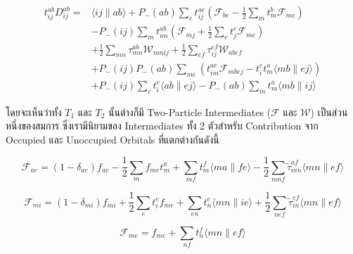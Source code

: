\noindent {}

\begin{equation}
  \label{eq:doubles_cluster_operator}
  \begin{aligned}
    t_{i j}^{a b} D_{i j}^{a b}
    =
     & \langle i j \| a b\rangle+P_{-}(a b) \sum_e t_{i j}^{a e}\left(\mathscr{F}_{b e}
    - \frac{1}{2} \sum_m t_m^b \mathscr{F}_{m e}\right)                                                             \\
     & - P_{-}(i j) \sum_m t_{i m}^{a b}\left(\mathscr{F}_{m j} + \frac{1}{2} \sum_e t_j^e \mathscr{F}_{m e}\right) \\
     & + \frac{1}{2} \sum_{m n} \tau_{m n}^{a b} \mathscr{W}_{m n i j}
    + \frac{1}{2} \sum_{e f} \tau_{i j}^{e f} \mathscr{W}_{a b e f}                                                 \\
     & + P_{-}(i j) P_{-}(a b) \sum_{m e}\left(t_{i m}^{a c} \mathscr{F}_{m b e j}
    - t_i^e t_m^a\langle m b \| e j\rangle\right)                                                                   \\
     & + P_{-}(i j) \sum_c t_i^e\langle a b \| e j\rangle-P_{-}(a b) \sum_m t_m^a\langle m b \| i j\rangle
  \end{aligned}
\end{equation}

\noindent โดยจะเห็นว่าทั้ง $T_{1}$ และ $T_{2}$ นั้นต่างก็มี Two-Particle Intermediates ($\mathscr{F}$ และ $\mathscr{W}$)
เป็นส่วนหนึ่งของสมการ ซึ่งเรามีนิยามของ Intermediates ทั้ง 2 ตัวสำหรับ Contribution จาก Occupied และ Unoccupied Orbitals
ที่แตกต่างกันดังนี้

\begin{equation}
  \label{eq:F_ae}
  \mathscr{F}_{a e}
  = \left(1-\delta_{a e}\right) f_{a e}-\frac{1}{2} \sum_m f_{m e} t_m^a
  + \sum_{m f} t_m^f\langle m a \| f e\rangle
  - \frac{1}{2} \sum_{m n f} \tilde{\tau}_{m n}^{a f}\langle m n \| e f\rangle
\end{equation}

\begin{equation}
  \label{eq:F_mi}
  \mathscr{F}_{m i}
  = \left(1-\delta_{m i}\right) f_{m i}+\frac{1}{2} \sum_e t_i^e f_{m e}
  + \sum_{e n} t_n^e\langle m n \| i e\rangle
  + \frac{1}{2} \sum_{n e f} \tilde{\tau}_{i n}^{e f}\langle m n \| e f\rangle
\end{equation}

\begin{equation}
  \label{eq:F_me}
  \mathscr{F}_{m e}
  =
  f_{m e}+\sum_{n f} t_n^f\langle m n \| e f\rangle
\end{equation}

